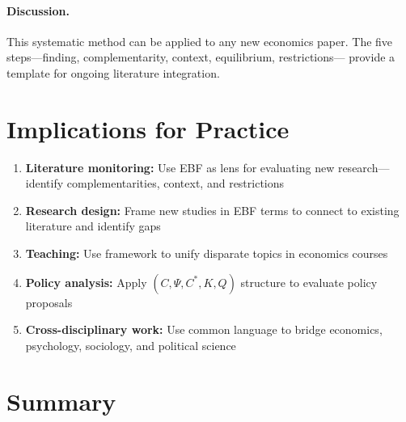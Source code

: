 \paragraph{Discussion.}
This systematic method can be applied to any new economics paper. The
five steps---finding, complementarity, context, equilibrium, restrictions---
provide a template for ongoing literature integration.


\section{Implications for Practice}
\label{sec:J-practice}

\begin{tcolorbox}[colback=green!5!white, colframe=green!75!black,
    title=Practical Implications]
\begin{enumerate}
\item \textbf{Literature monitoring:} Use EBF as lens for evaluating new
    research---identify complementarities, context, and restrictions
\item \textbf{Research design:} Frame new studies in EBF terms to connect
    to existing literature and identify gaps
\item \textbf{Teaching:} Use framework to unify disparate topics in
    economics courses
\item \textbf{Policy analysis:} Apply $(C, \Psi, C^*, K, Q)$ structure
    to evaluate policy proposals
\item \textbf{Cross-disciplinary work:} Use common language to bridge
    economics, psychology, sociology, and political science
\end{enumerate}
\end{tcolorbox}


%
%

\section{Summary}
\label{sec:J-summary}

